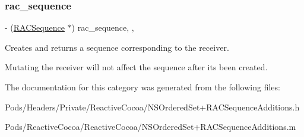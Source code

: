 \subsubsection{\texorpdfstring{rac\+\_\+sequence}{rac\_sequence}}
{\footnotesize\ttfamily -\/ (\mbox{\hyperlink{interface_r_a_c_sequence}{R\+A\+C\+Sequence}} $\ast$) rac\+\_\+sequence\hspace{0.3cm}{\ttfamily [read]}, {\ttfamily [nonatomic]}, {\ttfamily [copy]}}

Creates and returns a sequence corresponding to the receiver.

Mutating the receiver will not affect the sequence after it\textquotesingle{}s been created. 

The documentation for this category was generated from the following files\+:\begin{DoxyCompactItemize}
\item 
Pods/\+Headers/\+Private/\+Reactive\+Cocoa/N\+S\+Ordered\+Set+\+R\+A\+C\+Sequence\+Additions.\+h\item 
Pods/\+Reactive\+Cocoa/\+Reactive\+Cocoa/N\+S\+Ordered\+Set+\+R\+A\+C\+Sequence\+Additions.\+m\end{DoxyCompactItemize}
